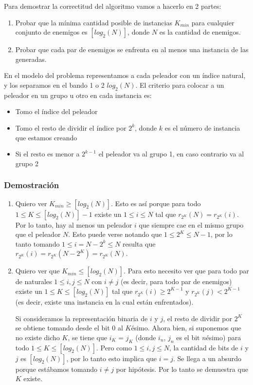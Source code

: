 Para demostrar la correctitud del algoritmo vamos a hacerlo en 2 partes:
\begin{enumerate}
\item Probar que la mínima cantidad posible de instancias $K_{min}$ para cualquier conjunto de enemigos es $[log_2(N)]$, donde $N$ es la cantidad de enemigos. 
\item Probar que cada par de enemigos se enfrenta en al menos una instancia de las generadas.
\end{enumerate}

En el modelo del problema representamos a cada peleador con un índice natural, y los separamos en el bando 1 o 2 $log_2(N)$.
El criterio para colocar a un peleador en un grupo u otro en cada instancia es:
\begin{itemize}
\item Tomo el índice del peleador
\item Tomo el resto de dividir el índice por $2^k$, donde $k$ es el número de instancia que estamos creando
\item Si el resto es menor a $2^{k-1}$ el peleador va al grupo 1, en caso contrario va al grupo 2
\end{itemize}

\subsubsection{Demostración}
\begin{enumerate}
\item Quiero ver $K_{min} \geq [log_2(N)]$. Esto es así porque para todo $1 \leq K \leq [log_2(N)] - 1$ existe un $1 \leq i \leq N$ tal que $r_{2^K}(N) = r_{2^K}(i)$. Por lo tanto, hay al menos un peleador $i$ que siempre cae en el mismo grupo que el peleador $N$. Esto puede verse notando que $1 \leq 2^K \leq N - 1$, por lo tanto tomando $1 \leq i = N-2^k \leq N$ resulta que $r_{2^K}(i) = r_{2^K}(N-2^K) = r_{2^K}(N)$.

\item Quiero ver que $K_{min} \leq [log_2(N)]$. Para esto necesito ver que para todo par de naturales $1 \leq i, j \leq N$ con $i \neq j$ (es decir, para todo par de enemigos) existe un $1 \leq K \leq [log_2(N)]$ tal que $r_{2^K}(i) \geq 2^{K-1}$ y $r_{2^K}(j) < 2^{K-1}$ (es decir, existe una instancia en la cual están enfrentados). 

Si consideramos la representación binaria de $i$ y $j$, el resto de dividir por $2^K$ se obtiene tomando desde el bit 0 al $K$ésimo. Ahora bien, si suponemos que no existe dicho $K$, se tiene que $i_K$ = $j_K$ (donde $i_n$, $j_n$ es el bit $n$ésimo) para todo $1 \leq K \leq [log_2(N)]$. Pero como $1 \leq i, j \leq N$, la cantidad de bits de $i$ y $j$ es $[log_2(N)]$, por lo tanto esto implica que $i = j$. Se llega a un absurdo porque estábamos tomando $i \neq j$ por hipótesis. Por lo tanto se demuestra que $K$ existe.
\end{enumerate}

